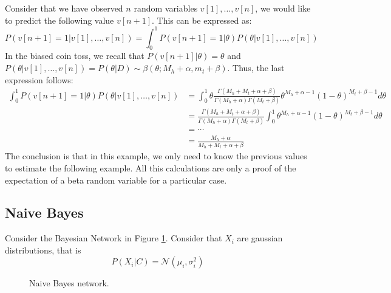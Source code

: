 Consider that we have observed \(n\) random variables \(v[1],\dots,v[n]\), we would like to predict the following value \(v[n+1]\). This can be expressed as:
\[
    P(v[n+1] = 1|v[1],\dots,v[n]) = \int_{0}^{1}P(v[n+1] = 1|\theta)P(\theta | v[1],\dots,v[n])
\]
In the biased coin toss, we recall that \(P(v[n+1]|\theta) = \theta\) and \(P(\theta|v[1],\dots ,v[n]) = P(\theta|D) \sim \beta(\theta ; M_{h} + \alpha, m_{t}+\beta)\). Thus, the last expression follows:
\begin{align*}
    \int_{0}^{1}P(v[n+1] = 1|\theta)P(\theta | v[1],\dots,v[n]) & = \int_{0}^{1}\theta \frac{\Gamma(M_{h} + M_{t} + \alpha + \beta)}{\Gamma(M_{h} + \alpha)\Gamma(M_{t} + \beta)} \theta^{M_{h}+ \alpha -1}(1-\theta)^{M_{t}+\beta - 1} d\theta \\
                                                                & =  \frac{\Gamma(M_{h} + M_{t} + \alpha + \beta)}{\Gamma(M_{h} + \alpha)\Gamma(M_{t} + \beta)} \int_{0}^{1} \theta^{M_{h}+ \alpha -1}(1-\theta)^{M_{t}+\beta - 1} d\theta      \\
                                                                & = \cdots                                                                                                                                                                      \\
                                                                & = \frac{M_{h} + \alpha}{M_{h} + M_{t}+ \alpha + \beta}
\end{align*}
The conclusion is that in this example, we only need to know the previous values to estimate the following example. All this calculations are only a proof of the expectation of a beta random variable for a particular case.


\subsection{Naive Bayes}

Consider the Bayesian Network in Figure \ref{fig:naive:bayes}. Consider that \(X_{i}\) are gaussian distributions, that is
\[
    P(X_{i}|C) = \mathcal N(\mu_i,\sigma_i^{2})
\]

\begin{figure}[H]
    \centering
    \caption{Naive Bayes network.}
    \label{fig:naive:bayes}
\end{figure}


